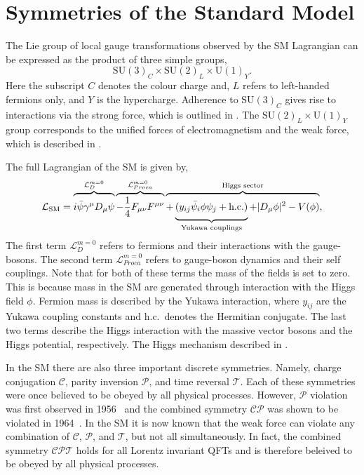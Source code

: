 \section{Symmetries of the Standard Model}
\label{sec:symmetries_of_sm}

The Lie group of local gauge transformations observed by the SM Lagrangian can be expressed as the product of three simple groups,
\begin{equation}
	\label{eq:sm_group}
	\text{SU}(3)_C \times \text{SU}(2)_L \times \text{U}(1)_Y.
\end{equation}
Here the subscript $C$ denotes the colour charge and, $L$ refers to left-handed fermions only, and $Y$ is the hypercharge.
Adherence to $\text{SU}(3)_C$ gives rise to interactions via the strong force, which is outlined in .
The $\text{SU}(2)_L \times \text{U}(1)_Y$ group corresponds to the unified forces of electromagnetism and the weak force, which is described in .

The full Lagrangian of the SM is given by,
\begin{equation}
	\label{eq:sm_lagrangian}
	\mathcal{L}_\text{SM} =
	\overbrace{
		\vphantom{\frac{1}{4}}
		i \bar \psi \gamma^\mu D_\mu \psi
	}^{\mathcal{L}_{D}^{m=0}
	}
	\overbrace{
		-\frac{1}{4} F_{\mu\nu} F^{\mu\nu}
	}^{\mathcal{L}_{Proca}^{m=0}
	}
	\overbrace{
		+
		\underbrace{
			\vphantom{\frac{1}{4}}
			(y_{ij} \bar \psi_i \phi \psi_j
			+ \text{h.c.})
		}_{\text{Yukawa couplings}}
		+ |D_\mu \phi|^2
		- V(\phi)
	}^{\text{Higgs sector}},
\end{equation}
The first term $\mathcal{L}_D^{m=0}$ refers to fermions and their interactions with the gauge-bosons.
The second term $\mathcal{L}_{Proca}^{m=0}$ refers to gauge-boson dynamics and their self couplings.
Note that for both of these terms the mass of the fields is set to zero.
This is because mass in the SM are generated through interaction with the Higgs field $\phi$.
Fermion mass is described by the Yukawa interaction, where $y_{ij}$ are the Yukawa coupling constants and h.c.\ denotes the Hermitian conjugate.
The last two terms describe the Higgs interaction with the massive vector bosons and the Higgs potential, respectively.
The Higgs mechanism described in .

In the SM there are also three important discrete symmetries.
Namely, charge conjugation $\mathcal{C}$, parity inversion $\mathcal{P}$, and time reversal $\mathcal{T}$.
Each of these symmetries were once believed to be obeyed by all physical processes.
However, $\mathcal{P}$ violation was first observed in 1956~\cite{Wu1957} and the combined symmetry $\mathcal{CP}$ was shown to be violated in 1964~\cite{CPViolation}.
In the SM it is now known that the weak force can violate any combination of $\mathcal{C}$, $\mathcal{P}$, and $\mathcal{T}$, but not all simultaneously.
In fact, the combined symmetry $\mathcal{CPT}$ holds for all Lorentz invariant QFTs and is therefore beleived to be obeyed by all physical processes.


